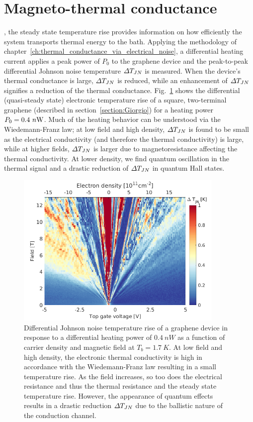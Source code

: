 \section{Magneto-thermal conductance}
\label{section:magneto-thermal_conductance}
, the steady state temperature rise provides information on how efficiently the system transports thermal energy to the bath. Applying the methodology of chapter~\ref{ch:thermal_conductance_via_electrical_noise}, a differential heating current applies a peak power of $P_0$ to the graphene device and the peak-to-peak differential Johnson noise temperature $\Delta T_{JN}$ is measured. When the device's thermal conductance is large, $\Delta T_{JN}$ is reduced, while an enhancement of $\Delta T_{JN}$ signifies a reduction of the thermal conductance. Fig.~\ref{fig:m_DT} shows the differential (quasi-steady state) electronic temperature rise of a square, two-terminal graphene (described in section~\ref{section:Giorgio}) for a heating power $P_0 = 0.4~n\mathrm{W}$. Much of the heating behavior can be understood via the Wiedemann-Franz law; at low field and high density, $\Delta T_{JN}$ is found to be small as the electrical conductivity (and therefore the thermal conductivity) is large, while at higher fields, $\Delta T_{JN}$ is larger due to magnetoresistance affecting the thermal conductivity. At lower density, we find quantum oscillation in the thermal signal and a drastic reduction of $\Delta T_{JN}$ in quantum Hall states.
\begin{figure}
\centering
\includegraphics[width=100mm]{figures/magneto/Fan_DT.png}
\caption{Differential Johnson noise temperature rise of a graphene device in response to a differential heating power of $0.4~nW$ as a function of carrier density and magnetic field at $T_b=1.7~K$. At low field and high density, the electronic thermal conductivity is high in accordance with the Wiedemann-Franz law resulting in a small temperature rise. As the field increases, so too does the electrical resistance and thus the thermal resistance and the steady state temperature rise. However, the appearance of quantum effects results in a drastic reduction $\Delta T_{JN}$ due to the  ballistic nature of the conduction channel.}
\label{fig:m_DT}
\end{figure}


